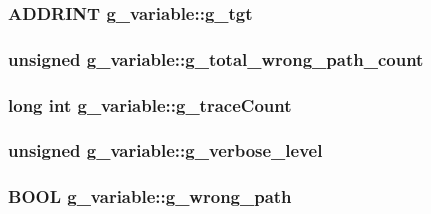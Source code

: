 \label{structg__variable_a992a1e746b4ab8d8ef422b522300f769}
\hypertarget{structg__variable_a34e0ec891cac1d35b52ed384463a0cf9}{
\subsubsection[{g\_\-tgt}]{\setlength{\rightskip}{0pt plus 5cm}ADDRINT {\bf g\_\-variable::g\_\-tgt}}}
\label{structg__variable_a34e0ec891cac1d35b52ed384463a0cf9}
\hypertarget{structg__variable_a155baf9caa1600f209b109f6eebf50eb}{
\subsubsection[{g\_\-total\_\-wrong\_\-path\_\-count}]{\setlength{\rightskip}{0pt plus 5cm}unsigned {\bf g\_\-variable::g\_\-total\_\-wrong\_\-path\_\-count}}}
\label{structg__variable_a155baf9caa1600f209b109f6eebf50eb}
\hypertarget{structg__variable_ad00b3634585f9cc7e89adb907114a290}{
\subsubsection[{g\_\-traceCount}]{\setlength{\rightskip}{0pt plus 5cm}long int {\bf g\_\-variable::g\_\-traceCount}}}
\label{structg__variable_ad00b3634585f9cc7e89adb907114a290}
\hypertarget{structg__variable_ac965e96976bbbeb71833c68438b5fc47}{
\subsubsection[{g\_\-verbose\_\-level}]{\setlength{\rightskip}{0pt plus 5cm}unsigned {\bf g\_\-variable::g\_\-verbose\_\-level}}}
\label{structg__variable_ac965e96976bbbeb71833c68438b5fc47}
\hypertarget{structg__variable_aeeef678f78f34f8743dc14c035ef56dd}{
\subsubsection[{g\_\-wrong\_\-path}]{\setlength{\rightskip}{0pt plus 5cm}BOOL {\bf g\_\-variable::g\_\-wrong\_\-path}}}
